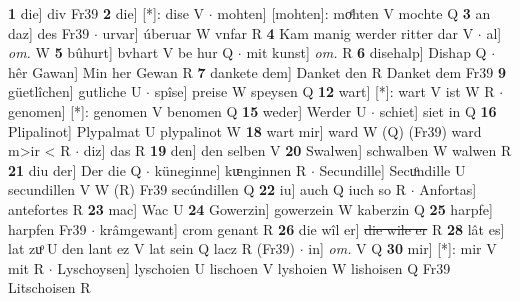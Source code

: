 \documentclass[8pt,a4paper,notitlepage]{article}
\begin{document}
\begin{table}[ht]
\begin{minipage}[t]{0.5\linewidth}
\textbf{1} die] div Fr39 \textbf{2} die] [*]: dise V  $\cdot$ mohten] [mohten]: moͤhten V mochte Q \textbf{3} an daz] des Fr39  $\cdot$ urvar] úberuar W vnfar R \textbf{4} Kam manig werder ritter dar V  $\cdot$ al] \textit{om.} W \textbf{5} bûhurt] bvhart V be hur Q  $\cdot$ mit kunst] \textit{om.} R \textbf{6} disehalp] Dishap Q  $\cdot$ hêr Gawan] Min her Gewan R \textbf{7} dankete dem] Danket den R Danket dem Fr39 \textbf{9} güetlîchen] gutliche U  $\cdot$ spîse] preise W speysen Q \textbf{12} wart] [*]: wart V ist W R  $\cdot$ genomen] [*]: genomen V benomen Q \textbf{15} weder] Werder U  $\cdot$ schiet] siet in Q \textbf{16} Plipalinot] Plypalmat U plypalinot W \textbf{18} wart mir] ward W (Q) (Fr39) ward m>ir < R  $\cdot$ diz] das R \textbf{19} den] den selben V \textbf{20} Swalwen] schwalben W walwen R \textbf{21} diu der] Der die Q  $\cdot$ küneginne] kᵫnginnen R  $\cdot$ Secundille] Secuͦndille U secundillen V W (R) Fr39 secúndillen Q \textbf{22} iu] auch Q iuch so R  $\cdot$ Anfortas] antefortes R \textbf{23} mac] Wac U \textbf{24} Gowerzin] gowerzein W kaberzin Q \textbf{25} harpfe] harpfen Fr39  $\cdot$ krâmgewant] crom genant R \textbf{26} die wîl er] \sout{die wile er} R \textbf{28} lât es] lat zuͦ U den lant ez V lat sein Q lacz R (Fr39)  $\cdot$ in] \textit{om.} V Q \textbf{30} mir] [*]: mir V mit R  $\cdot$ Lyschoysen] lyschoien U lischoen V lyshoien W lishoisen Q Fr39 Litschoisen R \newline
\end{minipage}
\end{table}
\end{document}

